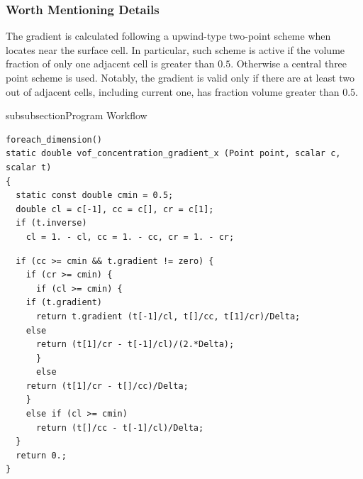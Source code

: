 \subsubsection{Worth Mentioning Details}
The gradient is calculated following a upwind-type two-point scheme when locates near the surface cell. In particular, such scheme is active if the volume fraction of only one adjacent cell is greater than $0.5$. Otherwise a central three point scheme is used. Notably, the gradient is valid only if there are at least two out of adjacent cells, including current one, has fraction volume greater than $0.5$.
\begin{codesection}{subsubsection}{Program Workflow}
\begin{verbatim}
foreach_dimension()
static double vof_concentration_gradient_x (Point point, scalar c, scalar t)
{
  static const double cmin = 0.5;
  double cl = c[-1], cc = c[], cr = c[1];
  if (t.inverse)
    cl = 1. - cl, cc = 1. - cc, cr = 1. - cr;
\end{verbatim}
\codearrow
{}
\begin{verbatim}
  if (cc >= cmin && t.gradient != zero) {
    if (cr >= cmin) {
      if (cl >= cmin) {
	if (t.gradient)
	  return t.gradient (t[-1]/cl, t[]/cc, t[1]/cr)/Delta;
	else
	  return (t[1]/cr - t[-1]/cl)/(2.*Delta);
      }
      else
	return (t[1]/cr - t[]/cc)/Delta;
    }
    else if (cl >= cmin)
      return (t[]/cc - t[-1]/cl)/Delta;
  }
  return 0.;
}
\end{verbatim}
\end{codesection}
